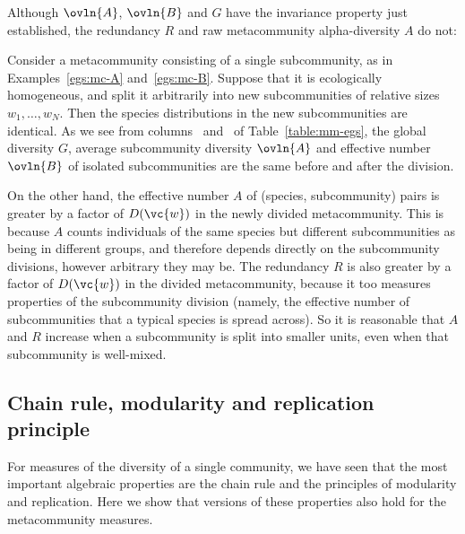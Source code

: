 Although $\ovln{A}$, $\ovln{B}$ and $G$ have the invariance property just
established, the redundancy $R$ and raw metacommunity alpha-diversity $A$
do not:

\begin{example}
Consider a metacommunity consisting of a single subcommunity, as in
Examples~\ref{egs:mc-A}
and~\ref{egs:mc-B}.  Suppose that it is ecologically
homogeneous, and split it arbitrarily into new subcommunities of relative
sizes $w_1, \ldots, w_N$.  Then the species distributions in the new
subcommunities are identical.  As we see from columns~
and~ of Table~\ref{table:mm-egs}, the global diversity
$G$, average subcommunity diversity $\ovln{A}$ and effective number
$\ovln{B}$ of isolated subcommunities are the same before and after the
division.

On the other hand, the effective number $A$ of (species, subcommunity)
pairs is greater by a factor of $D(\vc{w})$ in the newly divided
metacommunity.  This is because $A$ counts individuals of the same species
but different subcommunities as being in different groups, and therefore
depends directly on the subcommunity divisions, however arbitrary they
may be.  The redundancy $R$ is also greater by a factor of $D(\vc{w})$ in
the divided metacommunity, because it too measures properties of the
subcommunity division (namely, the effective number of subcommunities
that a typical species is spread across).  So it is reasonable
that $A$ and $R$ increase when a subcommunity is split into smaller units,
even when that subcommunity is well-mixed.
\end{example}


\subsection*{Chain rule, modularity and replication principle}

For measures of the diversity of a single community, we have seen that the
most important algebraic properties are the chain rule and the principles
of modularity and replication.  Here we show that versions of these
properties also hold for the metacommunity measures.

